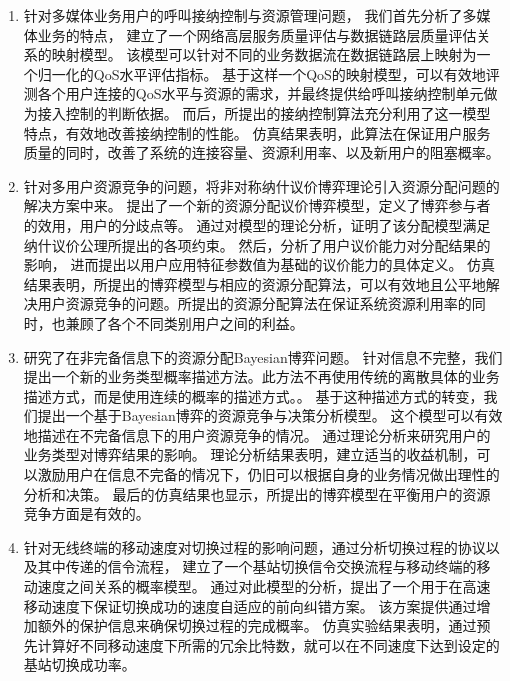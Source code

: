 \begin{enumerate}[(1.)]
\item
针对多媒体业务用户的呼叫接纳控制与资源管理问题，
我们首先分析了多媒体业务的特点，
建立了一个网络高层服务质量评估与数据链路层质量评估关系的映射模型。
该模型可以针对不同的业务数据流在数据链路层上映射为一个归一化的QoS水平评估指标。
基于这样一个QoS的映射模型，可以有效地评测各个用户连接的QoS水平与资源的需求，并最终提供给呼叫接纳控制单元做为接入控制的判断依据。
而后，所提出的接纳控制算法充分利用了这一模型特点，有效地改善接纳控制的性能。
仿真结果表明，此算法在保证用户服务质量的同时，改善了系统的连接容量、资源利用率、以及新用户的阻塞概率。
\item 针对多用户资源竞争的问题，将非对称纳什议价博弈理论引入资源分配问题的解决方案中来。
提出了一个新的资源分配议价博弈模型，定义了博弈参与者的效用，用户的分歧点等。
通过对模型的理论分析，证明了该分配模型满足纳什议价公理所提出的各项约束。
然后，分析了用户议价能力对分配结果的影响，
进而提出以用户应用特征参数值为基础的议价能力的具体定义。
仿真结果表明，所提出的博弈模型与相应的资源分配算法，可以有效地且公平地解决用户资源竞争的问题。所提出的资源分配算法在保证系统资源利用率的同时，也兼顾了各个不同类别用户之间的利益。

\item 研究了在非完备信息下的资源分配Bayesian博弈问题。
针对信息不完整，我们提出一个新的业务类型概率描述方法。此方法不再使用传统的离散具体的业务描述方式，而是使用连续的概率的描述方式。。
基于这种描述方式的转变，我们提出一个基于Bayesian博弈的资源竞争与决策分析模型。
这个模型可以有效地描述在不完备信息下的用户资源竞争的情况。
通过理论分析来研究用户的业务类型对博弈结果的影响。
理论分析结果表明，建立适当的收益机制，可以激励用户在信息不完备的情况下，仍旧可以根据自身的业务情况做出理性的分析和决策。
最后的仿真结果也显示，所提出的博弈模型在平衡用户的资源竞争方面是有效的。

\item 针对无线终端的移动速度对切换过程的影响问题，通过分析切换过程的协议以及其中传递的信令流程，
建立了一个基站切换信令交换流程与移动终端的移动速度之间关系的概率模型。
通过对此模型的分析，提出了一个用于在高速移动速度下保证切换成功的速度自适应的前向纠错方案。
该方案提供通过增加额外的保护信息来确保切换过程的完成概率。
仿真实验结果表明，通过预先计算好不同移动速度下所需的冗余比特数，就可以在不同速度下达到设定的基站切换成功率。
\end{enumerate}

